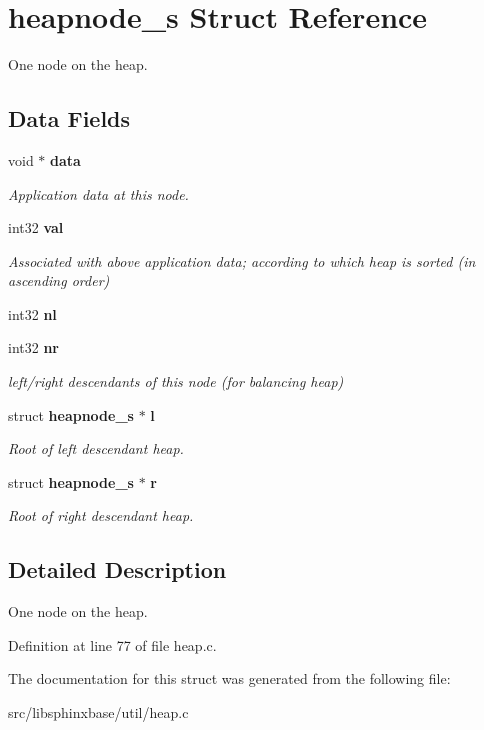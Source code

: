 \section{heapnode\-\_\-s Struct Reference}
\label{structheapnode__s}


One node on the heap.  


\subsection*{Data Fields}
\begin{DoxyCompactItemize}
\item 
void $\ast$ {\bf data}\label{structheapnode__s_a2cac1684dd94b922db98de988232efeb}

\begin{DoxyCompactList}\small\item\em Application data at this node. \end{DoxyCompactList}\item 
int32 {\bf val}\label{structheapnode__s_a02a74be7915860cf3fc436d5fed6fe7d}

\begin{DoxyCompactList}\small\item\em Associated with above application data; according to which heap is sorted (in ascending order) \end{DoxyCompactList}\item 
int32 {\bfseries nl}\label{structheapnode__s_a9fd3eb832298ae9ca73896835d38e6d5}

\item 
int32 {\bf nr}\label{structheapnode__s_ab5a21ee1a48ce5359bbcca1d416a51eb}

\begin{DoxyCompactList}\small\item\em left/right descendants of this node (for balancing heap) \end{DoxyCompactList}\item 
struct {\bf heapnode\-\_\-s} $\ast$ {\bf l}\label{structheapnode__s_af25b6bfb16162294dd35851e04ad6c6b}

\begin{DoxyCompactList}\small\item\em Root of left descendant heap. \end{DoxyCompactList}\item 
struct {\bf heapnode\-\_\-s} $\ast$ {\bf r}\label{structheapnode__s_a92c30e27e1ccdbaea15f28aa49b0f7ea}

\begin{DoxyCompactList}\small\item\em Root of right descendant heap. \end{DoxyCompactList}\end{DoxyCompactItemize}


\subsection{Detailed Description}
One node on the heap. 

Definition at line 77 of file heap.\-c.



The documentation for this struct was generated from the following file\-:\begin{DoxyCompactItemize}
\item 
src/libsphinxbase/util/heap.\-c\end{DoxyCompactItemize}
